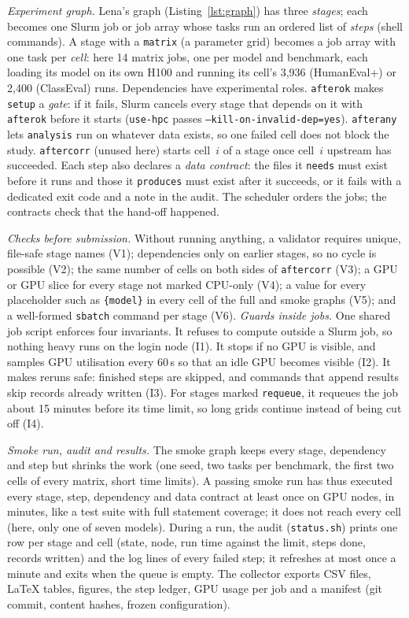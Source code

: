 \documentclass[10pt,conference]{IEEEtran}
\newcommand{\tool}{\texttt{use-hpc}}
\newcommand{\code}[1]{\texttt{#1}}
\begin{document}
\emph{Experiment graph.} Lena's graph (Listing~\ref{lst:graph}) has three \emph{stages}; each becomes one Slurm job or job array whose tasks run an ordered list of \emph{steps} (shell commands). A stage with a \code{matrix} (a parameter grid) becomes a job array with one task per \emph{cell}: here 14 matrix jobs, one per model and benchmark, each loading its model on its own H100 and running its cell's 3{,}936 (HumanEval+) or 2{,}400 (ClassEval) runs. Dependencies have experimental roles. \code{afterok} makes \code{setup} a \emph{gate}: if it fails, Slurm cancels every stage that depends on it with \code{afterok} before it starts (\tool{} passes \code{--kill-on-invalid-dep=yes}). \code{afterany} lets \code{analysis} run on whatever data exists, so one failed cell does not block the study. \code{aftercorr} (unused here) starts cell~$i$ of a stage once cell~$i$ upstream has succeeded. Each step also declares a \emph{data contract}: the files it \code{needs} must exist before it runs and those it \code{produces} must exist after it succeeds, or it fails with a dedicated exit code and a note in the audit. The scheduler orders the jobs; the contracts check that the hand-off happened.

\emph{Checks before submission.} Without running anything, a validator requires unique, file-safe stage names (V1); dependencies only on earlier stages, so no cycle is possible (V2); the same number of cells on both sides of \code{aftercorr} (V3); a GPU or GPU slice for every stage not marked CPU-only (V4); a value for every placeholder such as \code{\{model\}} in every cell of the full and smoke graphs (V5); and a well-formed \code{sbatch} command per stage (V6). \emph{Guards inside jobs.} One shared job script enforces four invariants. It refuses to compute outside a Slurm job, so nothing heavy runs on the login node (I1). It stops if no GPU is visible, and samples GPU utilisation every 60\,s so that an idle GPU becomes visible (I2). It makes reruns safe: finished steps are skipped, and commands that append results skip records already written (I3). For stages marked \code{requeue}, it requeues the job about 15 minutes before its time limit, so long grids continue instead of being cut off (I4).

\emph{Smoke run, audit and results.} The smoke graph keeps every stage, dependency and step but shrinks the work (one seed, two tasks per benchmark, the first two cells of every matrix, short time limits). A passing smoke run has thus executed every stage, step, dependency and data contract at least once on GPU nodes, in minutes, like a test suite with full statement coverage; it does not reach every cell (here, only one of seven models). During a run, the audit (\code{status.sh}) prints one row per stage and cell (state, node, run time against the limit, steps done, records written) and the log lines of every failed step; it refreshes at most once a minute and exits when the queue is empty. The collector exports CSV files, \LaTeX{} tables, figures, the step ledger, GPU usage per job and a manifest (git commit, content hashes, frozen configuration).
\end{document}
